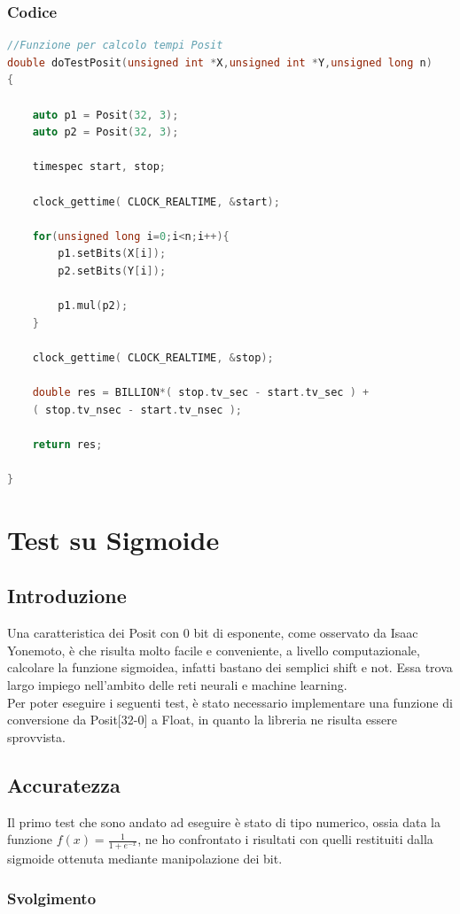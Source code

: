 \documentclass[a4paper,11pt]{article}
\begin{document}
\subsubsection{Codice}
\begin{lstlisting}[language=C++]
//Funzione per calcolo tempi Posit
double doTestPosit(unsigned int *X,unsigned int *Y,unsigned long n)
{

	auto p1 = Posit(32, 3);
	auto p2 = Posit(32, 3);    
	
	timespec start, stop;
	
	clock_gettime( CLOCK_REALTIME, &start);
	
	for(unsigned long i=0;i<n;i++){
		p1.setBits(X[i]);
		p2.setBits(Y[i]);
	
		p1.mul(p2);
	}
	
	clock_gettime( CLOCK_REALTIME, &stop);
	
	double res = BILLION*( stop.tv_sec - start.tv_sec ) + 
	( stop.tv_nsec - start.tv_nsec );
	
	return res;

}


\end{lstlisting}
\newpage
\section{Test su Sigmoide}
\subsection{Introduzione}
Una caratteristica dei Posit con 0 bit di esponente, come osservato da Isaac Yonemoto, è che risulta molto facile e conveniente, a livello computazionale, calcolare la funzione sigmoidea, infatti bastano dei semplici shift e not. Essa trova largo impiego nell'ambito delle reti neurali e machine learning.
\\Per poter eseguire i seguenti test, è stato necessario implementare una funzione di conversione da Posit[32-0] a Float, in quanto la libreria ne risulta essere sprovvista.

\subsection{Accuratezza}
Il primo test che sono andato ad eseguire è stato di tipo numerico, ossia data la funzione  $ f(x) = \frac {1}{1 + e^{-x}} $, ne ho confrontato i risultati con quelli restituiti dalla sigmoide ottenuta mediante manipolazione dei bit.

\subsubsection{Svolgimento}
\end{document}
